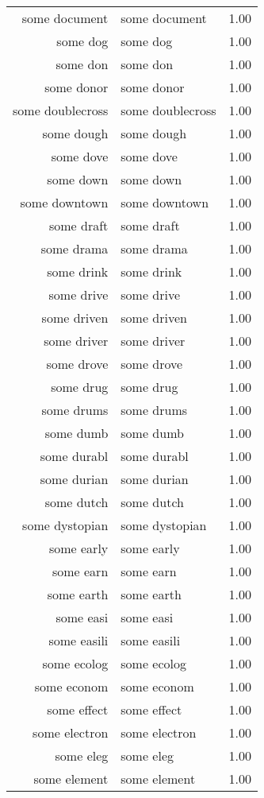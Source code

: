 \begin{table}[ht]
\begin{tabular}{rlr}
  some document & some document & 1.00 \\ 
  some dog & some dog & 1.00 \\ 
  some don & some don & 1.00 \\ 
  some donor & some donor & 1.00 \\ 
  some doublecross & some doublecross & 1.00 \\ 
  some dough & some dough & 1.00 \\ 
  some dove & some dove & 1.00 \\ 
  some down & some down & 1.00 \\ 
  some downtown & some downtown & 1.00 \\ 
  some draft & some draft & 1.00 \\ 
  some drama & some drama & 1.00 \\ 
  some drink & some drink & 1.00 \\ 
  some drive & some drive & 1.00 \\ 
  some driven & some driven & 1.00 \\ 
  some driver & some driver & 1.00 \\ 
  some drove & some drove & 1.00 \\ 
  some drug & some drug & 1.00 \\ 
  some drums & some drums & 1.00 \\ 
  some dumb & some dumb & 1.00 \\ 
  some durabl & some durabl & 1.00 \\ 
  some durian & some durian & 1.00 \\ 
  some dutch & some dutch & 1.00 \\ 
  some dystopian & some dystopian & 1.00 \\ 
  some early & some early & 1.00 \\ 
  some earn & some earn & 1.00 \\ 
  some earth & some earth & 1.00 \\ 
  some easi & some easi & 1.00 \\ 
  some easili & some easili & 1.00 \\ 
  some ecolog & some ecolog & 1.00 \\ 
  some econom & some econom & 1.00 \\ 
  some effect & some effect & 1.00 \\ 
  some electron & some electron & 1.00 \\ 
  some eleg & some eleg & 1.00 \\ 
  some element & some element & 1.00 \\ 

\end{tabular}
\end{table}
